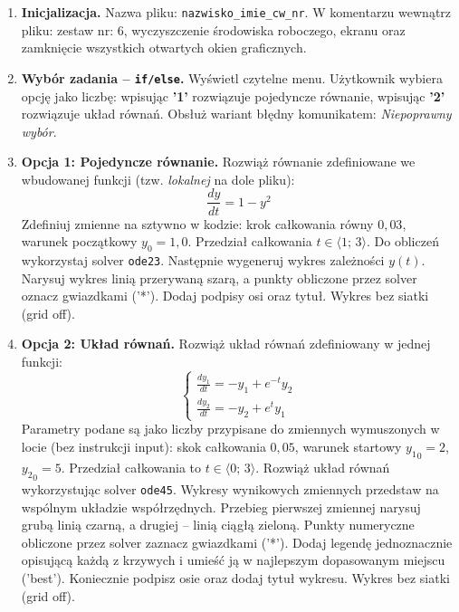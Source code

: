 \documentclass[a4paper,11pt]{article}
\begin{document}
\begin{enumerate}[leftmargin=*, label=\textbf{\arabic*.}, itemsep=2pt]

  \item \textbf{Inicjalizacja.}
    Nazwa pliku: \texttt{nazwisko\_imie\_cw\_nr}. W komentarzu wewnątrz pliku: zestaw nr: 6, wyczyszczenie środowiska roboczego, ekranu oraz zamknięcie wszystkich otwartych okien graficznych.

  \item \textbf{Wybór zadania -- \texttt{if/else}.}
    Wyświetl czytelne menu. Użytkownik wybiera opcję jako liczbę: wpisując \textbf{'1'} rozwiązuje pojedyncze równanie, wpisując \textbf{'2'} rozwiązuje układ równań. Obsłuż wariant błędny komunikatem: \textit{Niepoprawny wybór}.

  \item \textbf{Opcja 1: Pojedyncze równanie.}
    Rozwiąż równanie zdefiniowane we wbudowanej funkcji (tzw. \textit{lokalnej} na dole pliku):
    \[ \frac{dy}{dt} = 1 - y^2 \]
    Zdefiniuj zmienne na sztywno w kodzie: krok całkowania równy $0{,}03$, warunek początkowy $y_0 = 1{,}0$. Przedział całkowania $t \in \langle 1;\,3 \rangle$.
    Do obliczeń wykorzystaj solver \texttt{ode23}. Następnie wygeneruj wykres zależności $y(t)$. Narysuj wykres linią przerywaną szarą, a punkty obliczone przez solver oznacz gwiazdkami ('*'). Dodaj podpisy osi oraz tytuł. Wykres bez siatki (grid off).

  \item \textbf{Opcja 2: Układ równań.}
    Rozwiąż układ równań zdefiniowany w jednej funkcji:\\[-0.5em]
    \[
    \begin{cases}
      \frac{dy_1}{dt} = -y_1 + e^{-t}y_2 \\
      \frac{dy_2}{dt} = -y_2 + e^{t}y_1
    \end{cases}
    \]
    Parametry podane są jako liczby przypisane do zmiennych wymuszonych w locie (bez instrukcji input): skok całkowania $0{,}05$, warunek startowy $ {y_1}_{0} = 2 $, $ {y_2}_{0} = 5 $. Przedział całkowania to $t \in \langle 0;\,3 \rangle$.
    Rozwiąż układ równań wykorzystując solver \texttt{ode45}. Wykresy wynikowych zmiennych przedstaw na wspólnym układzie współrzędnych. Przebieg pierwszej zmiennej narysuj grubą linią czarną, a drugiej -- linią ciągłą zieloną. Punkty numeryczne obliczone przez solver zaznacz gwiazdkami ('*'). Dodaj legendę jednoznacznie opisującą każdą z krzywych i umieść ją w najlepszym dopasowanym miejscu ('best'). Koniecznie podpisz osie oraz dodaj tytuł wykresu. Wykres bez siatki (grid off).

\end{enumerate}
\end{document}
